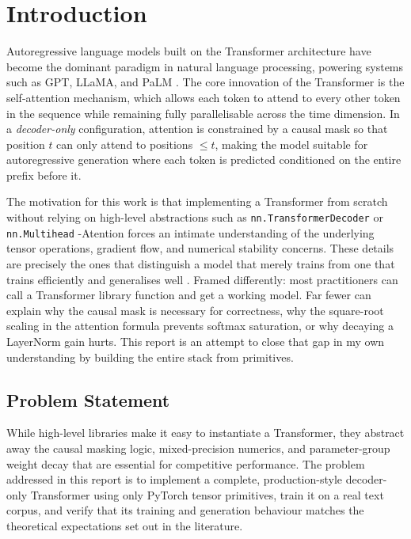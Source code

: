 \section{Introduction}
\label{sec:intro}

Autoregressive language models built on the Transformer architecture have
become the dominant paradigm in natural language processing, powering
systems such as GPT, LLaMA, and PaLM
\parencite{vaswani2017attention, radford2019language, brown2020language}.
The core innovation of the Transformer is the self-attention mechanism,
which allows each token to attend to every other token in the sequence
while remaining fully parallelisable across the time dimension. In a
\emph{decoder-only} configuration, attention is constrained by a causal
mask so that position $t$ can only attend to positions $\leq t$, making
the model suitable for autoregressive generation where each token is
predicted conditioned on the entire prefix before it.

\noindent The motivation for this work is that implementing a Transformer from
scratch without relying on high-level abstractions such as
\texttt{nn.TransformerDecoder} or \texttt{nn.Multihead} -{Atention} forces
an intimate understanding of the underlying tensor operations, gradient
flow, and numerical stability concerns. These details are precisely the
ones that distinguish a model that merely trains from one that trains
efficiently and generalises well \parencite{karpathy2023nanogpt}. Framed
differently: most practitioners can call a Transformer library function
and get a working model. Far fewer can explain why the causal mask is
necessary for correctness, why the square-root scaling in the attention
formula prevents softmax saturation, or why decaying a LayerNorm gain
hurts. This report is an attempt to close that gap in my own
understanding by building the entire stack from primitives.

\subsection{Problem Statement}
While high-level libraries make it easy to instantiate a Transformer,
they abstract away the causal masking logic, mixed-precision numerics,
and parameter-group weight decay that are essential for competitive
performance. The problem addressed in this report is to implement a
complete, production-style decoder-only Transformer using only PyTorch
tensor primitives, train it on a real text corpus, and verify that its
training and generation behaviour matches the theoretical expectations
set out in the literature.

